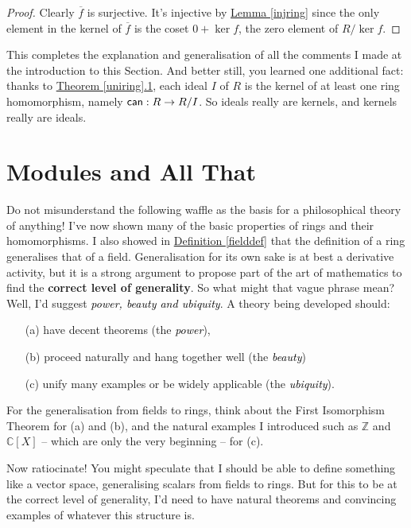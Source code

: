 \documentclass[11pt]{amsbook}
\theoremstyle{definition}
\begin{document}
\begin{proof} Clearly $\overline{f}$ is surjective. It's injective by \hyperref[injring]{Lemma \ref{injring}} since the only element in the kernel of $\overline{f}$ is the coset $0 + \ker f$, the zero element of $R/\ker f$.  \end{proof}

This completes the explanation and generalisation of all the comments I made at the introduction to this Section. And better still, you learned one additional fact: thanks to \hyperref[uniring]{Theorem \ref{uniring}.1}, each ideal $I$ of $R$ is the kernel of at least one ring homomorphism, namely ${\sf can}: R\to R/I$.  So ideals really are kernels, and kernels really are ideals.

\section{Modules and All That}
{Do not misunderstand the following waffle as the basis for a philosophical theory of anything!} I've now shown many of the basic properties of rings and their homomorphisms. I also showed in \hyperref[fielddef]{Definition \ref{fielddef}} that the definition of a ring generalises that of a field. Generalisation for its own sake is at best a derivative activity, but it is a strong argument to propose part of the art of mathematics to find the {\bf correct level of generality}. So what might that vague phrase mean? Well, I'd suggest \textcolor{black}{\it power, beauty and ubiquity}. A theory being developed should:
\begin{enumerate}
\item[(a)] have decent theorems (the \textcolor{black}{\it power}),
\item[(b)] proceed naturally and hang together well (the \textcolor{black}{\it beauty})
\item[(c)] unify  many examples or be widely applicable (the \textcolor{black}{\it ubiquity}).
\end{enumerate}
For the generalisation from fields to rings, think about the First Isomorphism Theorem for (a) and (b), and the natural examples I introduced such as $\mathbb{Z}$ and $\mathbb{C}[X]$ -- which are only the very beginning -- for (c).

Now ratiocinate! You might speculate that I should be able to define something like a vector space, generalising scalars from fields to rings. But for this to be at the correct level of generality, I'd need to have natural theorems and convincing examples of whatever this structure is.
\end{document}
